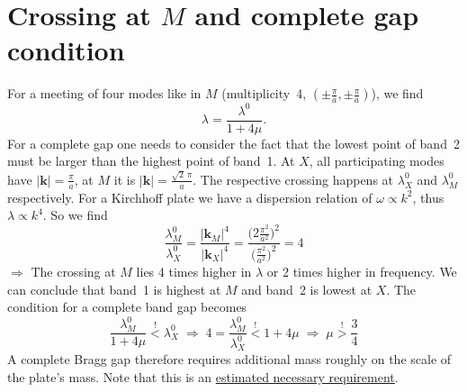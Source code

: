 \section{Crossing at $M$ and complete gap condition}

For a meeting of four modes like in $M$ (multiplicity~4,
$(\pm\frac{\pi}{a}, \pm\frac{\pi}{a})$), we find
\begin{equation}
  \lambda = \frac{\lambda^0}{1 + 4\mu} .
\end{equation}
For a complete gap one needs to consider the fact that the lowest point of
band~2 must be larger than the highest point of band~1.
At $X$, all participating modes have $|\mathbf{k}| = \frac{\pi}{a}$, at $M$ it
is $|\mathbf{k}| = \frac{\sqrt{2}\,\pi}{a}$.
The respective crossing happens at
$\lambda_X^0$ and $\lambda_M^0$ respectively. For a Kirchhoff plate we have a
dispersion relation of $\omega \propto k^2$, thus $\lambda \propto k^4$. So we
find
\begin{equation}
  \frac{\lambda_M^0}{\lambda_X^0} = \frac{|\mathbf{k}_M|^4}{|\mathbf{k}_X|^4}
  = \frac{\bigl(2\frac{\pi^2}{a^2}\bigr)^2}{\bigl(\frac{\pi^2}{a^2}\bigr)^2} = 4
\end{equation}
$\Rightarrow$ The crossing at $M$ lies 4 times higher in $\lambda$ or 2 times
higher in frequency.
We can conclude that band~1 is highest at $M$ and band~2 is lowest at $X$.
The condition for a complete band gap becomes
\begin{equation}
  \frac{\lambda_M^0}{1 + 4\mu} \overset{!}{<} \lambda_X^0
  \;\Rightarrow\;
  4 = \frac{\lambda_M^0}{\lambda_X^0} \overset{!}{<} 1 + 4\mu
  \;\Rightarrow\;
  \boxed{\mu \overset{!}{>} \frac{3}{4}}
\end{equation}
A complete Bragg gap therefore requires additional mass roughly on the scale of
the plate's mass. Note that this is an \underline{estimated necessary
requirement}.
